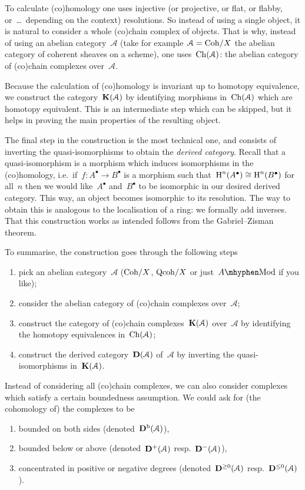 To calculate (co)homology one uses injective (or projective, or flat, or flabby, or~\dots\ depending on the context) resolutions. So instead of using a single object, it is natural to consider a whole (co)chain complex of objects. That is why, instead of using an abelian category~$\mathcal{A}$ (take for example~$\mathcal{A}=\mathrm{Coh}/X$ the abelian category of coherent sheaves on a scheme), one uses~$\operatorname{Ch}(\mathcal{A})$: the abelian category of (co)chain complexes over~$\mathcal{A}$.

Because the calculation of (co)homology is invariant up to homotopy equivalence, we construct the category~$\mathbf{K}(\mathcal{A})$ by identifying morphisms in~$\operatorname{Ch}(\mathcal{A})$ which are homotopy equivalent. This is an intermediate step which can be skipped, but it helps in proving the main properties of the resulting object.

The final step in the construction is the most technical one, and consists of inverting the quasi-isomorphisms to obtain the \emph{derived category}. Recall that a quasi-isomorphism is a morphism which induces isomorphisms in the (co)homology, i.e.\ if~$f\colon A^\bullet\to B^\bullet$ is a morphism such that~$\operatorname{H}^n(A^\bullet)\cong\operatorname{H}^n(B^\bullet)$ for all~$n$ then we would like~$A^\bullet$ and~$B^\bullet$ to be isomorphic in our desired derived category. This way, an object becomes isomorphic to its resolution. The way to obtain this is analogous to the localisation of a ring: we formally add inverses. That this construction works as intended follows from the Gabriel--Zisman theorem.

To summarise, the construction goes through the following steps
\begin{enumerate}
  \item pick an abelian category~$\mathcal{A}$ ($\mathrm{Coh}/X$, $\mathrm{Qcoh}/X$ or just~$A\mhyphen\mathrm{Mod}$ if you like);
  \item consider the abelian category of (co)chain complexes over~$\mathcal{A}$;
  \item construct the category of (co)chain complexes~$\mathbf{K}(\mathcal{A})$ over~$\mathcal{A}$ by identifying the homotopy equivalences in~$\operatorname{Ch}(\mathcal{A})$;
  \item construct the derived category~$\mathbf{D}(\mathcal{A})$ of~$\mathcal{A}$ by inverting the quasi-isomorphisms in~$\mathbf{K}(\mathcal{A})$.
\end{enumerate}
Instead of considering all (co)chain complexes, we can also consider complexes which satisfy a certain boundedness assumption. We could ask for (the cohomology of) the complexes to be
\begin{enumerate}
  \item bounded on both sides (denoted~$\mathbf{D}^{\mathrm{b}}(\mathcal{A})$),
  \item bounded below or above (denoted~$\mathbf{D}^+(\mathcal{A})$ resp.\ $\mathbf{D}^-(\mathcal{A})$),
  \item concentrated in positive or negative degrees (denoted~$\mathbf{D}^{\geq 0}(\mathcal{A})$ resp.\ $\mathbf{D}^{\leq 0}(\mathcal{A})$).
\end{enumerate}

